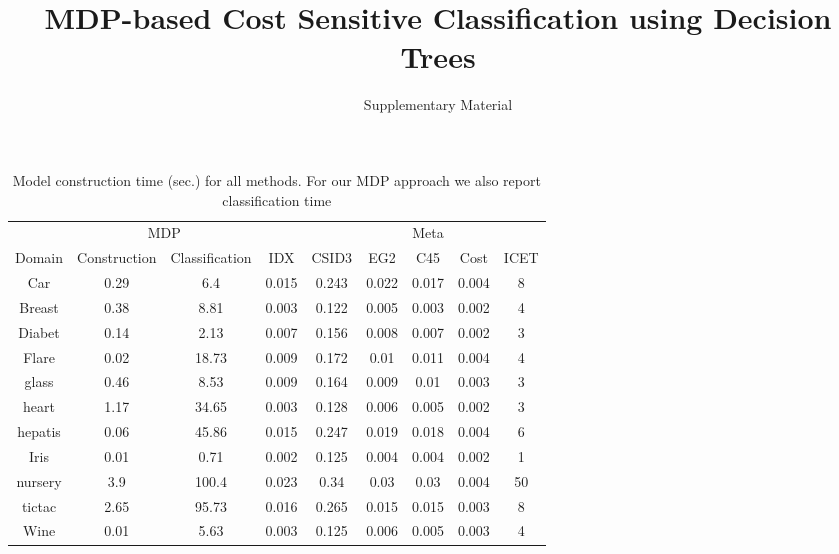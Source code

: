\documentclass[letterpaper]{article}
\theoremstyle{definition}
\begin{document}
%
%
\title{MDP-based Cost Sensitive Classification using Decision Trees}

\author{Supplementary Material}

\maketitle



\begin{table}[h]
\centering

\caption{Model construction time (sec.) for all methods. For our MDP approach we also report classification time}
\label{tbl:time}
\begin{tabular}{|c||c|c|c|c|c|c|c|c|}
\hline
&\multicolumn{2}{c|}{MDP}&&&&Meta& &\\

Domain  & Construction & Classification & IDX &CSID3&EG2&C45&Cost&ICET\\ \hline\hline
Car	&0.29	&6.4	&0.015	&0.243	&0.022	&0.017	&0.004	&8	\\ \hline
Breast	&0.38	&8.81	&0.003	&0.122	&0.005	&0.003	&0.002	&4	\\ \hline
Diabet	&0.14	&2.13	&0.007	&0.156	&0.008	&0.007	&0.002	&3	\\ \hline
Flare	&0.02	&18.73	&0.009	&0.172	&0.01	&0.011	&0.004	&4	\\ \hline
glass	&0.46	&8.53	&0.009	&0.164	&0.009	&0.01	&0.003	&3	\\ \hline
heart	&1.17	&34.65	&0.003	&0.128	&0.006	&0.005	&0.002	&3	\\ \hline
hepatis	&0.06	&45.86	&0.015	&0.247	&0.019	&0.018	&0.004	&6	\\ \hline
Iris	&0.01	&0.71	&0.002	&0.125	&0.004	&0.004	&0.002	&1	\\ \hline
nursery	&3.9	&100.4	&0.023	&0.34	&0.03	&0.03	&0.004	&50	\\ \hline
tictac	&2.65	&95.73	&0.016	&0.265	&0.015	&0.015	&0.003	&8	\\ \hline
Wine	&0.01	&5.63	&0.003	&0.125	&0.006	&0.005	&0.003	&4	\\ \hline
\end{tabular}
\end{table}
\end{document}

